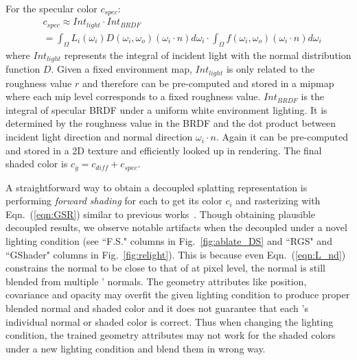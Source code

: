 For the specular color $c_{spec}$:
\begin{equation}
\begin{aligned}
    &c_{spec} \approx Int_{light} \cdot Int_{BRDF} \\
            &= \int_{\Omega}  L_i(\omega_{i}) D(\omega_i, \omega_o) (\omega_{i} \cdot n) d \omega_i \cdot
    \int_{\Omega} f(\omega_{i}, \omega_{o}) (\omega_{i} \cdot n) d \omega_i
\end{aligned}
\end{equation}
where $Int_{light}$ represents the integral of incident light with the normal distribution function $D$. 
Given a fixed environment map, $Int_{light}$ is only related to the roughness value $r$ and therefore can be pre-computed and stored in a mipmap where each mip level corresponds to a fixed roughness value. 
$Int_{BRDF}$ is the integral of specular BRDF under a uniform white environment lighting. 
It is determined by the roughness value in the BRDF and the dot product between incident light direction and normal direction $\omega_{i} \cdot n$. 
Again it can be pre-computed and stored in a 2D texture and efficiently looked up in rendering. 
The final shaded color is $c_g = c_{diff} + c_{spec}$. 

A straightforward way to obtain a decoupled  splatting representation is performing \textit{forward shading} for each  to get its color $c_i$ and rasterizing  with Eqn.~(\ref{eqn:GSR}) similar to previous works~\cite{invrender, NeRFactor, GIR, GaussianShader}. 
Though obtaining plausible decoupled results, we observe notable artifacts when  the decoupled  under a novel lighting condition (see ``F.S." columns in Fig.~\ref{fig:ablate_DS} and ``RGS" and ``GShader" columns in Fig.~\ref{fig:relight}). 
This is because even  Eqn.~(\ref{eqn:L_nd}) constrains the  normal to be close to that of \neusbranch at pixel level, the  normal is still blended from multiple ' normals. 
The geometry attributes like position, covariance and opacity may overfit the given lighting condition to produce proper blended normal and shaded color and it does not guarantee that each 's individual normal or shaded color is correct. 
Thus when changing the lighting condition, the trained geometry attributes may not work for the shaded colors under a new lighting condition and blend them in  wrong way.  

